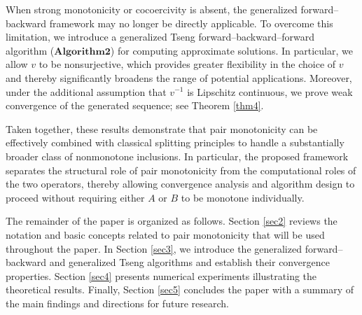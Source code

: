 \documentclass[11pt]{article}
\theoremstyle{definition}
\theoremstyle{definition}
\theoremstyle{definition}
\begin{document}
When strong monotonicity or cocoercivity is absent, the generalized forward–backward framework may no longer be directly applicable. To overcome this limitation, we introduce a generalized Tseng forward–backward–forward algorithm ($\mathbf{Algorithm 2}$) for computing approximate solutions. In particular, we allow $v$ to be nonsurjective, which provides greater flexibility in the choice of $v$ and thereby significantly broadens the range of potential applications.
Moreover, under the additional assumption that $v^{-1}$ is Lipschitz continuous, we prove weak convergence of the generated sequence; see Theorem \ref{thm4}. 

Taken together, these results demonstrate that pair monotonicity can be effectively combined with classical splitting principles to handle a substantially broader class of nonmonotone inclusions. In particular, the proposed framework separates the structural role of pair monotonicity from the computational roles of the two operators, thereby allowing convergence analysis and algorithm design to proceed without requiring either $A$ or $B$ to be monotone individually.

The remainder of the paper is organized as follows. Section \ref{sec2} reviews the notation and basic concepts related to pair monotonicity that will be used throughout the paper. In Section \ref{sec3}, we introduce the generalized forward--backward and generalized Tseng algorithms and establish their convergence properties. Section \ref{sec4} presents numerical experiments illustrating the theoretical results. Finally, Section \ref{sec5} concludes the paper with a summary of the main findings and directions for future research.
\end{document}
